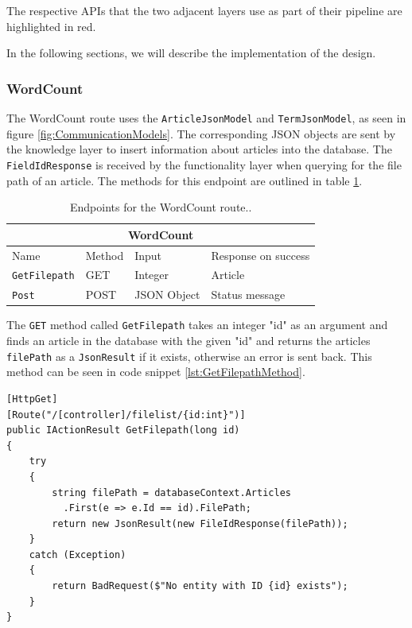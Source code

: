 The respective APIs that the two adjacent layers use as part of their pipeline are highlighted in red. 

In the following sections, we will describe the implementation of the design.

\subsubsection{WordCount}

The WordCount route uses the \texttt{ArticleJsonModel} and \texttt{TermJsonModel}, as seen in figure \ref{fig:CommunicationModels}. The corresponding JSON objects are sent by the knowledge layer to insert information about articles into the database. The \texttt{FieldIdResponse} is received by the functionality layer when querying for the file path of an article. The methods for this endpoint are outlined in table \ref{fig:WordCountEndpoint}.

\begin{table}[h]
  \centering
    \begin{tabular}{|llll|}
    \hline
    \multicolumn{4}{|c|}{\textbf{WordCount}}                                                                                 \\ \hline
    \multicolumn{1}{|l|}{Name}                 & \multicolumn{1}{l|}{Method} & \multicolumn{1}{l|}{Input}       & Response on success       \\ \hline
    \multicolumn{1}{|l|}{\texttt{GetFilepath}} & \multicolumn{1}{l|}{GET}    & \multicolumn{1}{l|}{Integer}     & Article        \\ \hline
    \multicolumn{1}{|l|}{\texttt{Post}}        & \multicolumn{1}{l|}{POST}   & \multicolumn{1}{l|}{JSON Object} & Status message \\ \hline
    \end{tabular}
  \caption{Endpoints for the WordCount route.\label{fig:WordCountEndpoint}.}
\end{table}

The \texttt{GET} method called \texttt{GetFilepath} takes an integer "id" as an argument and finds an article in the database with the given "id" and returns the articles \texttt{filePath} as a \texttt{JsonResult} if it exists, otherwise an error is sent back.
This method can be seen in code snippet \ref{lst:GetFilepathMethod}.

\begin{lstlisting}[language=CSharp, caption={The \texttt{GetFilepath} method.}, label={lst:GetFilepathMethod}]
[HttpGet]
[Route("/[controller]/filelist/{id:int}")]
public IActionResult GetFilepath(long id)
{
    try
    {
        string filePath = databaseContext.Articles
          .First(e => e.Id == id).FilePath;
        return new JsonResult(new FileIdResponse(filePath));
    }
    catch (Exception)
    {
        return BadRequest($"No entity with ID {id} exists");
    }
}
\end{lstlisting}

